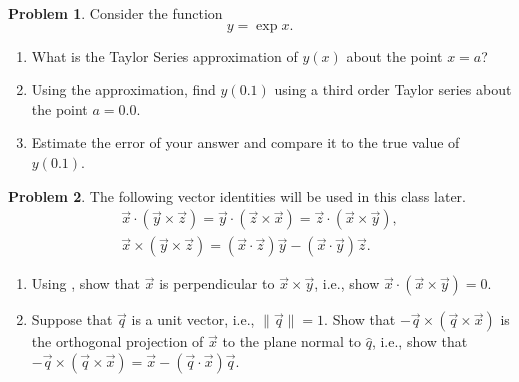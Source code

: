 \documentclass[10pt]{article}
\theoremstyle{definition}
\newtheorem{prob}{Problem}[section]
\newenvironment{subprob}%
{\renewcommand{\theenumi}{\alph{enumi}}\renewcommand{\labelenumi}{(\theenumi)}\begin{enumerate}}%
{\end{enumerate}}%
\begin{document}
\begin{prob}
    Consider the function
    \begin{equation}
        y = \exp{x}.
    \end{equation}
    \begin{subprob}
    \item What is the Taylor Series approximation of \( y (x) \) about the point \( x = a \)?
    \item Using the approximation, find \( y (0.1) \) using a third order Taylor series about the point \( a = 0.0 \).
    \item Estimate the error of your answer and compare it to the true value of \( y(0.1)\).
    \end{subprob}
\end{prob}
\begin{prob}
The following vector identities will be used in this class later.
\begin{gather}
\vec x \cdot (\vec y \times \vec z) =
\vec y \cdot (\vec z \times \vec x) =
\vec z \cdot (\vec x \times \vec y),\label{eqn:iden1}\\
\vec x \times (\vec y \times \vec z) =
(\vec x \cdot \vec z) \vec y - (\vec x\cdot \vec y) \vec z.
\end{gather}
\begin{subprob}
\item Using , show that $\vec x$ is perpendicular to $\vec x\times \vec y$, i.e., show $\vec x\cdot (\vec x\times \vec y)=0$.
\item Suppose that $\vec q$ is a unit vector, i.e., $\|\vec q\|=1$. Show that $- \vec q \times (\vec q \times \vec x)$ is the orthogonal projection of $\vec x$ to the plane normal to $\hat q$, i.e., show that $- \vec q \times (\vec q \times \vec x)=\vec x - (\vec q\cdot \vec x) \vec q$.
\end{subprob}

\end{prob}
\end{document}
